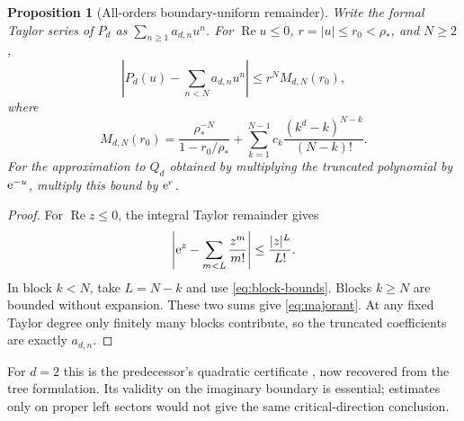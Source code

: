 \documentclass[11pt,a4paper]{article}
\numberwithin{equation}{section}
\newtheorem{proposition}[theorem]{Proposition}
\theoremstyle{definition}\newtheorem{definition}[theorem]{Definition}
\theoremstyle{remark}\newtheorem{remark}[theorem]{Remark}
\theoremstyle{definition}
\newcommand{\Rea}{\operatorname{Re}}\newcommand{\Ima}{\operatorname{Im}}
\begin{document}
\begin{proposition}[All-orders boundary-uniform remainder]
\label{prop:remainder}
Write the formal Taylor series of $P_d$ as $\sum_{n\ge1}a_{d,n}u^n$.
For $\Rea u\le0$, $r=|u|\le r_0<\rho_*$, and $N\ge2$,
\begin{equation}
 \left|P_d(u)-\sum_{n<N}a_{d,n}u^n\right|
 \le r^N M_{d,N}(r_0),
 \label{eq:remainder-bound}
\end{equation}
where
\begin{equation}
 M_{d,N}(r_0)=\frac{\rho_*^{-N}}{1-r_0/\rho_*}
 +\sum_{k=1}^{N-1}c_k\frac{(k^d-k)^{N-k}}{(N-k)!}.
 \label{eq:majorant}
\end{equation}
For the approximation to $Q_d$ obtained by multiplying the truncated
polynomial by $\mathrm e^{-u}$, multiply this bound by $\mathrm e^r$.
\end{proposition}
\begin{proof}
For $\Rea z\le0$, the integral Taylor remainder gives
\[
 \left|\mathrm e^z-\sum_{m<L}\frac{z^m}{m!}\right|\le\frac{|z|^L}{L!}.
\]
In block $k<N$, take $L=N-k$ and use \eqref{eq:block-bounds}. Blocks $k\ge N$
are bounded without expansion. These two sums give \eqref{eq:majorant}.
At any fixed Taylor degree only finitely many blocks contribute, so the
truncated coefficients are exactly $a_{d,n}$.
\end{proof}
For $d=2$ this is the predecessor's quadratic certificate \cite{repo-fine},
now recovered from the tree formulation. Its validity on the imaginary
boundary is essential; estimates only on proper left sectors would not give
the same critical-direction conclusion.
\end{document}
